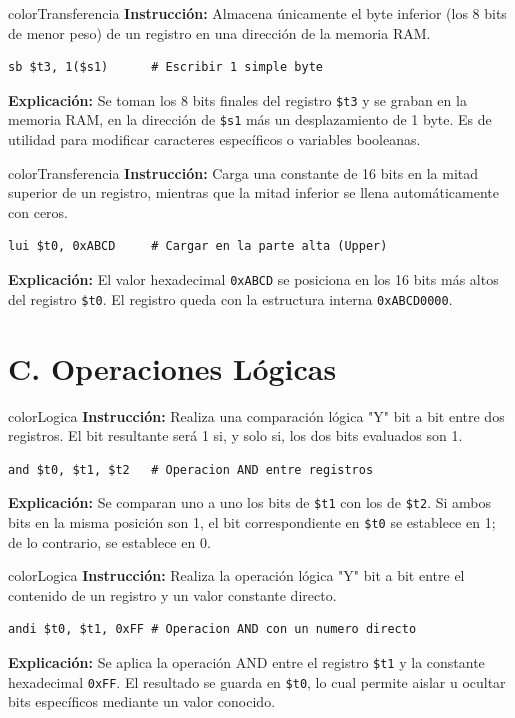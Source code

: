 \documentclass[12pt,a4paper]{article}
\begin{document}
\begin{instructionBox}{colorTransferencia}
\textbf{Instrucción:} Almacena únicamente el byte inferior (los 8 bits de menor peso) de un registro en una dirección de la memoria RAM.
\begin{lstlisting}
sb $t3, 1($s1)      # Escribir 1 simple byte
\end{lstlisting}
\textbf{Explicación:} Se toman los 8 bits finales del registro \texttt{\$t3} y se graban en la memoria RAM, en la dirección de \texttt{\$s1} más un desplazamiento de 1 byte. Es de utilidad para modificar caracteres específicos o variables booleanas.
\end{instructionBox}

\begin{instructionBox}{colorTransferencia}
\textbf{Instrucción:} Carga una constante de 16 bits en la mitad superior de un registro, mientras que la mitad inferior se llena automáticamente con ceros.
\begin{lstlisting}
lui $t0, 0xABCD     # Cargar en la parte alta (Upper)
\end{lstlisting}
\textbf{Explicación:} El valor hexadecimal \texttt{0xABCD} se posiciona en los 16 bits más altos del registro \texttt{\$t0}. El registro queda con la estructura interna \texttt{0xABCD0000}.
\end{instructionBox}

\section*{\textcolor{colorLogica}{C. Operaciones Lógicas}}

\begin{instructionBox}{colorLogica}
\textbf{Instrucción:} Realiza una comparación lógica "Y"  bit a bit entre dos registros. El bit resultante será 1 si, y solo si, los dos bits evaluados son 1.
\begin{lstlisting}
and $t0, $t1, $t2   # Operacion AND entre registros
\end{lstlisting}
\textbf{Explicación:} Se comparan uno a uno los bits de \texttt{\$t1} con los de \texttt{\$t2}. Si ambos bits en la misma posición son 1, el bit correspondiente en \texttt{\$t0} se establece en 1; de lo contrario, se establece en 0.
\end{instructionBox}

\begin{instructionBox}{colorLogica}
\textbf{Instrucción:} Realiza la operación lógica "Y"  bit a bit entre el contenido de un registro y un valor constante directo.
\begin{lstlisting}
andi $t0, $t1, 0xFF # Operacion AND con un numero directo
\end{lstlisting}
\textbf{Explicación:} Se aplica la operación AND entre el registro \texttt{\$t1} y la constante hexadecimal \texttt{0xFF}. El resultado se guarda en \texttt{\$t0}, lo cual permite aislar u ocultar bits específicos mediante un valor conocido.
\end{instructionBox}
\end{document}
